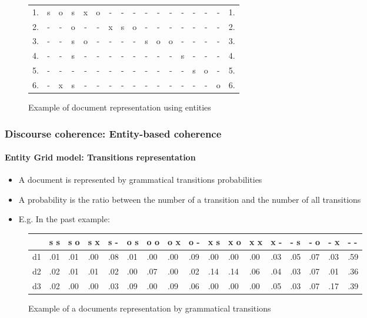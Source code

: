 \documentclass[xcolor=table]{beamer}
\begin{document}
\begin{frame}
\begin{figure}
\begin{tabular}{ccccccccccccccccc}
			1. & s & o & s & x & o & - & - & - & - & - & - & - & - & - & - & 1. \\
			2. & - & - & o & - & - & x & s & o & - & - & - & - & - & - & - & 2. \\
			3. & - & - & s & o & - & - & - & - & s & o & o & - & - & - & - & 3. \\
			4. & - & - & s & - & - & - & - & - & - & - & - & s & - & - & - & 4. \\
			5. & - & - & - & - & - & - & - & - & - & - & - & - & s & o & - & 5. \\
			6. & - & x & s & - & - & - & - & - & - & - & - & - & - & - & o & 6. \\
			
		\end{tabular}
		\caption{Example of document representation using entities \cite{2008-barzilay-lapata}}
	\end{figure}
	
\end{frame}

\begin{frame}
	\frametitle{Discourse coherence: Entity-based coherence}
	\framesubtitle{Entity Grid model: Transitions representation}
	
	\begin{itemize}
		\item A document is represented by grammatical transitions probabilities
		\item A probability is the ratio between the number of a transition and the number of all transitions
		\item E.g. In the past example: 
	\end{itemize}
	\begin{figure}
		\tiny\bfseries
		\begin{tabular}{lllllllllllllllll}
			\hline
			& s s & s o & s x & s - & o s & o o & o x & o - & x s & x o & x x & x - & - s & - o & - x & - - \\
			\hline
			d1 & .01 & .01 & .00 & .08 & .01 & .00 & .00 & .09 & .00 & .00 & .00 & .03 & .05 & .07 & .03 & .59 \\
			d2 & .02 & .01 & .01 & .02 & .00 & .07 & .00 & .02 & .14 & .14 & .06 & .04 & .03 & .07 & .01 & .36 \\
			d3 & .02 & .00 & .00 & .03 & .09 & .00 & .09 & .06 & .00 & .00 & .00 & .05 & .03 & .07 & .17 & .39 \\
			\hline
		\end{tabular}
		\caption{Example of a documents representation by grammatical transitions \cite{2008-barzilay-lapata}}
	\end{figure}
	
\end{frame}
\end{document}
